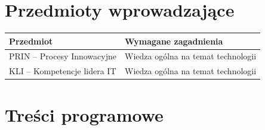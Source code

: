 \documentclass[12pt, a4paper]{article}
\newcommand{\thdrule}{\noalign{\global\setlength{\extrarowheight}{0pt}}}
\newcommand{\thdend}{\noalign{\global\setlength{\extrarowheight}{3pt}}}
\begin{document}
\section{Przedmioty wprowadzające}

{\scriptsize
\begin{tabularx}{\textwidth}{m{5cm}Y}
\thdrule\toprule
{} {\color{white}\textbf{Przedmiot}} & {\color{white}\textbf{Wymagane zagadnienia}} \\
\midrule\thdend
   PRIN – Procesy Innowacyjne & Wiedza ogólna na temat technologii \\
   KLI – Kompetencje lidera IT & Wiedza ogólna na temat technologii \\
\bottomrule
\end{tabularx}}

\section{Treści programowe}
\end{document}
